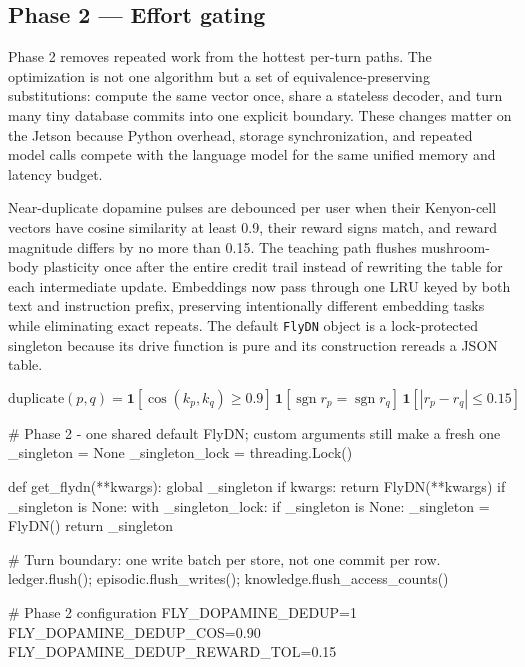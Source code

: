 \documentclass[11pt]{article}
\begin{document}
\subsection{Phase 2 — Effort gating}

Phase 2 removes repeated work from the hottest per-turn paths. The optimization is not one algorithm but a set of equivalence-preserving substitutions: compute the same vector once, share a stateless decoder, and turn many tiny database commits into one explicit boundary. These changes matter on the Jetson because Python overhead, storage synchronization, and repeated model calls compete with the language model for the same unified memory and latency budget.

Near-duplicate dopamine pulses are debounced per user when their Kenyon-cell vectors have cosine similarity at least 0.9, their reward signs match, and reward magnitude differs by no more than 0.15. The teaching path flushes mushroom-body plasticity once after the entire credit trail instead of rewriting the table for each intermediate update. Embeddings now pass through one LRU keyed by both text and instruction prefix, preserving intentionally different embedding tasks while eliminating exact repeats. The default \texttt{FlyDN} object is a lock-protected singleton because its drive function is pure and its construction rereads a JSON table.

\begin{equation}
\mathrm{duplicate}(p,q)=\mathbf{1}[\cos(k_p,k_q)\ge0.9]\,\mathbf{1}[\operatorname{sgn}r_p=\operatorname{sgn}r_q]\,\mathbf{1}[|r_p-r_q|\le0.15]
\tag{2}
\end{equation}

\begin{CodeBlock}
# Phase 2 - one shared default FlyDN; custom arguments still make a fresh one
_singleton = None
_singleton_lock = threading.Lock()

def get_flydn(**kwargs):
    global _singleton
    if kwargs:
        return FlyDN(**kwargs)
    if _singleton is None:
        with _singleton_lock:
            if _singleton is None:
                _singleton = FlyDN()
    return _singleton

# Turn boundary: one write batch per store, not one commit per row.
ledger.flush(); episodic.flush_writes(); knowledge.flush_access_counts()
\end{CodeBlock}

\begin{CodeBlock}
# Phase 2 configuration
FLY_DOPAMINE_DEDUP=1
FLY_DOPAMINE_DEDUP_COS=0.90
FLY_DOPAMINE_DEDUP_REWARD_TOL=0.15
\end{CodeBlock}
\end{document}
